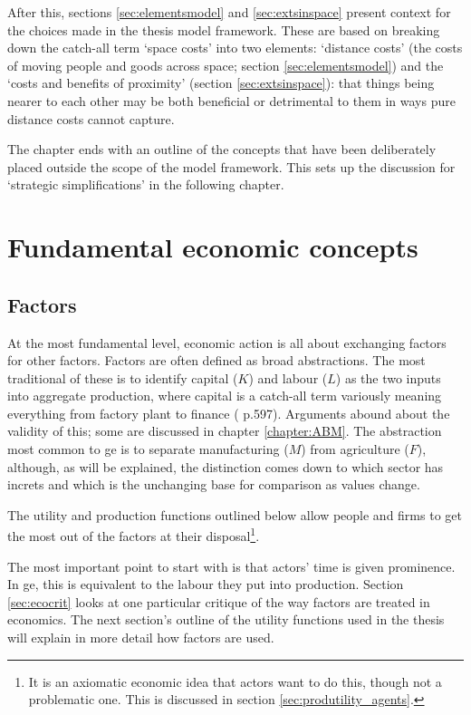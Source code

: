 After this, sections \ref{sec:elementsmodel} and \ref{sec:extsinspace} present context for the choices made in the thesis model framework. These are based on breaking down the catch-all term `space costs' into two elements: `distance costs' (the costs of moving people and goods across space; section \ref{sec:elementsmodel}) and the `costs and benefits of proximity'  (section \ref{sec:extsinspace}): that things being nearer to each other may be both beneficial or detrimental to them in ways pure distance costs cannot capture. 

The chapter ends with an outline of the concepts that have been deliberately placed outside the scope of the model framework. This sets up the discussion for `strategic simplifications' in the following chapter.

\section{Fundamental economic concepts \label{sec:econconceptsintro}}

\subsection{Factors \label{sec:factors1}}

At the most fundamental level, economic action is all about exchanging factors for other factors. Factors are often defined as broad abstractions. The most traditional of these is to identify capital ($K$) and labour ($L$) as the two inputs into aggregate production, where capital is a catch-all term variously meaning everything from factory plant to finance (\citealt{robinson_measure_1971} p.597). Arguments abound about the validity of this; some are discussed in chapter \ref{chapter:ABM}. The abstraction most common to \gls{ge} is to separate manufacturing ($M$) from agriculture ($F$), although, as will be explained, the distinction comes down to which sector has \gls{increts} and which is the unchanging base for comparison as values change.

The utility and production functions outlined below allow people and firms to get the most out of the factors at their disposal\footnote{It is an axiomatic economic idea that actors want to do this, though not a problematic one. This is discussed in section \ref{sec:produtility_agents}.}. 

The most important point to start with is that actors' time is given prominence. In \gls{ge}, this is equivalent to the labour they put into production. Section \ref{sec:ecocrit} looks at one particular critique of the way factors are treated in economics. The next section's outline of the utility functions used in the thesis will explain in more detail how factors are used.

